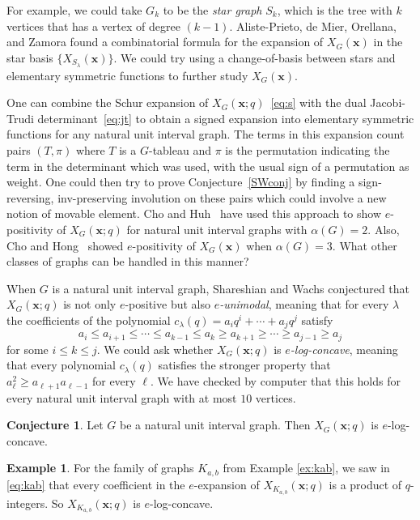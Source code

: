 \documentclass[12pt]{amsart}  %
\theoremstyle{definition}
\newtheorem{conjecture}[theorem]{Conjecture}
\newtheorem{example}[theorem]{Example}
\theoremstyle{remark}
\numberwithin{equation}{section}
\begin{document}
For example, we could take $G_k$ to be the \emph{star graph} $S_k$, which is the tree with $k$ vertices that has a vertex of degree $(k-1)$. Aliste-Prieto, de Mier, Orellana, and Zamora \cite[Theorem 3.2]{markedgraphs} found a combinatorial formula for the expansion of $X_G(\bm x)$ in the star basis $\{X_{S_\lambda}(\bm x)\}$. We could try using a change-of-basis between stars and elementary symmetric functions to further study $X_G(\bm x)$.


One can combine the Schur expansion of $X_G(\bm x;q)$~\eqref{eq:s} with the dual Jacobi-Trudi determinant~\eqref{eq:jt} to obtain a signed expansion into elementary symmetric functions for any natural unit interval graph.  The terms in this expansion  count pairs $(T,\pi)$ where $T$ is a $G$-tableau and $\pi$ is the permutation indicating the term in the determinant which was used, with the usual sign of a permutation as weight.  One could then try to prove Conjecture~\ref{SWconj} by finding a sign-reversing, inv-preserving involution on these pairs which could involve a new notion of movable element.  Cho and Huh~\cite{chromstoe} have used this approach to show $e$-positivity  of $X_G(\bm x;q)$ for natural unit interval graphs with $\alpha(G)= 2$.  Also, Cho and Hong~\cite{chrombounce3} showed $e$-positivity of $X_G(\bm x)$
when $\alpha(G)=3$.  What other classes of graphs can be handled in this manner?

When $G$ is a natural unit interval graph, Shareshian and Wachs conjectured that $X_G(\bm x;q)$ is not only $e$-positive but also \emph{$e$-unimodal}, meaning that for every $\lambda$ the coefficients of the polynomial $c_\lambda(q)=a_iq^i+\cdots+a_jq^j$ satisfy 
$$a_i\leq a_{i+1}\leq\cdots\leq a_{k-1}\leq a_k\geq a_{k+1}\geq\cdots\geq a_{j-1}\geq a_j$$
for some $i\leq k\leq j$. We could ask whether $X_G(\bm x;q)$ is \emph{$e$-log-concave}, meaning that every polynomial $c_\lambda(q)$ satisfies the stronger property that $a_\ell^2\geq a_{\ell+1}a_{\ell-1}$ for every $\ell$.   We have checked by computer that this holds for every natural unit interval graph with at most $10$ vertices.

\begin{conjecture}
Let $G$ be a natural unit interval graph. Then $X_G(\bm x;q)$ is $e$-log-concave.
\end{conjecture}

\begin{example}
For the family of graphs $K_{a,b}$ from Example \ref{ex:kab}, we saw in \eqref{eq:kab} that every coefficient in the $e$-expansion of $X_{K_{a,b}}(\bm x;q)$ is a product of $q$-integers.  So $X_{K_{a,b}}(\bm x;q)$ is $e$-log-concave.
\end{example}
\end{document}
